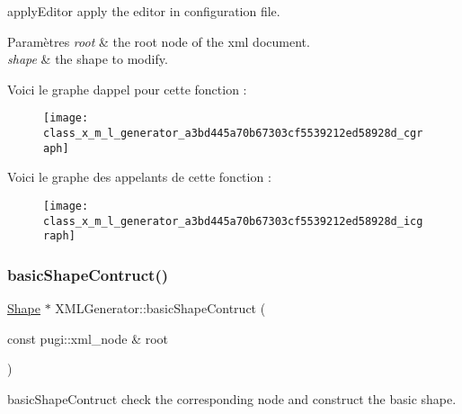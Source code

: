 apply\+Editor apply the editor in configuration file. 


\begin{DoxyParams}{Paramètres}
{\em root} & the root node of the xml document. \\
\hline
{\em shape} & the shape to modify. \\
\hline
\end{DoxyParams}
Voici le graphe d\textquotesingle{}appel pour cette fonction \+:\nopagebreak
\begin{figure}[H]
\begin{center}
\leavevmode
\texttt{[image: class\_x\_m\_l\_generator\_a3bd445a70b67303cf5539212ed58928d\_cgraph]}
\end{center}
\end{figure}
Voici le graphe des appelants de cette fonction \+:\nopagebreak
\begin{figure}[H]
\begin{center}
\leavevmode
\texttt{[image: class\_x\_m\_l\_generator\_a3bd445a70b67303cf5539212ed58928d\_icgraph]}
\end{center}
\end{figure}
\mbox{\label{class_x_m_l_generator_acbd95e69a36222e6f8906a77e6530f1b}} 
\subsubsection{\texorpdfstring{basic\+Shape\+Contruct()}{basicShapeContruct()}}
{\footnotesize\ttfamily \hyperlink{class_shape}{Shape} $\ast$ X\+M\+L\+Generator\+::basic\+Shape\+Contruct (\begin{DoxyParamCaption}\item[{const pugi\+::xml\+\_\+node \&}]{root }\end{DoxyParamCaption})\hspace{0.3cm}{\ttfamily [private]}}



basic\+Shape\+Contruct check the corresponding node and construct the basic shape. 


